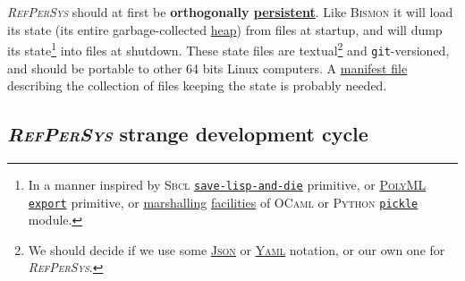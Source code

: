 \documentclass[11pt,a4paper,svgnames]{article}
\newcommand{\RefPerSys}{{\textit{\textsc{RefPerSys}}}}
\begin{document}
{\RefPerSys} should at first be \textbf{orthogonally
  \href{https://en.wikipedia.org/wiki/Persistence\_(computer\_science)}{persistent}}. Like
\textsc{Bismon} \cite{Starynkevitch:2019:bismon-draft} it will load
its state (its entire garbage-collected
\href{https://en.wikipedia.org/wiki/Memory\_management#HEAP}{heap})
from files at startup, and will dump its state\footnote{In a manner
inspired by \textsc{Sbcl}
\href{http://www.sbcl.org/manual/index.html\#Saving-a-Core-Image}{\texttt{save-lisp-and-die}}
primitive, or \href{https://www.polyml.org/}{\textsc{PolyML}}
\href{https://www.polyml.org/documentation/Reference/PolyMLStructure.html\#export}{\texttt{export}}
primitive, or
\href{https://en.wikipedia.org/wiki/Marshalling_(computer_science)}{marshalling}
\href{https://caml.inria.fr/pub/docs/manual-ocaml/libref/Marshal.html}{facilities} of \textsc{OCaml} or \textsc{Python}
\href{https://docs.python.org/3/library/pickle.html}{\texttt{pickle}}
module.} into files at shutdown. These state files are
textual\footnote{We should decide if we use some
\href{http://json.org/}{\textsc{Json}} or
\href{http://yaml.org/}{\textsc{Yaml}} notation, or our own one for
\RefPerSys.} and \texttt{git}-versioned, and should be portable to
other 64 bits Linux computers. A
\href{https://en.wikipedia.org/wiki/Manifest\_file}{manifest file}
describing the collection of files keeping the state is probably
needed.

\subsection{{\RefPerSys} strange development cycle}
\label{subsec:strange-devel}
\end{document}
